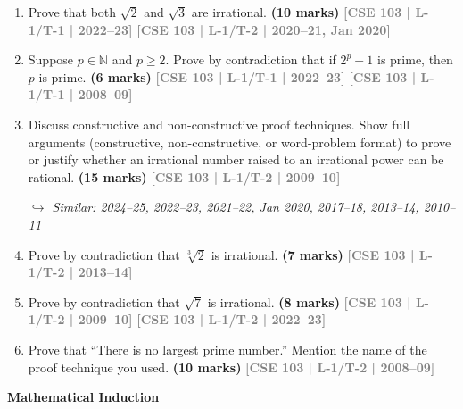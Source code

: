 \documentclass[12pt,a3paper]{article}
\newcommand{\yr}[1]{\hfill\textcolor{gray}{\small\textbf{[#1]}}}
\newcommand{\mk}[1]{\textcolor{orange!70!black}{\small\textbf{(#1 marks)}}}
\newcommand{\variant}[1]{\par\vspace{1pt}\textcolor{blue!50!black}%
  {\footnotesize\textit{$\hookrightarrow$ Similar: #1}}}
\newcommand{\subtopic}[2]{%
  \vspace{10pt}
  \noindent\begin{tcolorbox}[colback=#1!8,colframe=#1,boxrule=0.6pt,arc=4pt,
    left=6pt,right=6pt,top=4pt,bottom=4pt]
    \small\bfseries\textcolor{#1}{#2}
  \end{tcolorbox}
  \vspace{2pt}
}
\begin{document}
\begin{enumerate}

\item Prove that both $\sqrt{2}$ and $\sqrt{3}$ are irrational. 
\mk{10} \yr{CSE 103 | L-1/T-1 | 2022--23} \yr{CSE 103 | L-1/T-2 | 2020--21, Jan 2020}

\item Suppose $p \in \mathbb{N}$ and $p \geq 2$. Prove by contradiction that if $2^p - 1$ is prime, then $p$ is prime.
\mk{6} \yr{CSE 103 | L-1/T-1 | 2022--23} \yr{CSE 103 | L-1/T-1 | 2008--09}

\item Discuss constructive and non-constructive proof techniques. Show full arguments (constructive, non-constructive, or word-problem format) to prove or justify whether an irrational number raised to an irrational power can be rational.
\mk{15} \yr{CSE 103 | L-1/T-2 | 2009--10} \variant{2024--25, 2022--23, 2021--22, Jan 2020, 2017--18, 2013--14, 2010--11}

\item Prove by contradiction that $\sqrt[3]{2}$ is irrational.
\mk{7} \yr{CSE 103 | L-1/T-2 | 2013--14}  

\item Prove by contradiction that $\sqrt{7}$ is irrational.
\mk{8} \yr{CSE 103 | L-1/T-2 | 2009--10} \yr{CSE 103 | L-1/T-2 | 2022--23}

\item Prove that ``There is no largest prime number.'' Mention the name of the proof technique you used.
\mk{10} \yr{CSE 103 | L-1/T-2 | 2008--09}

\end{enumerate}


\subtopic{cA}{Mathematical Induction}
\label{sub:s2-induction}
\end{document}

